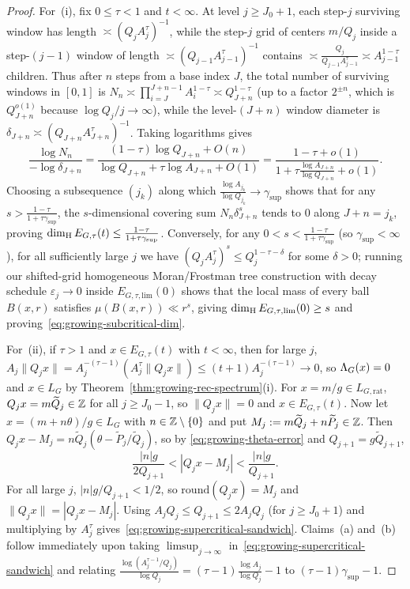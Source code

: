 \begin{proof}
For~(i), fix $0\le\tau<1$ and $t<\infty$. At level $j\ge J_0+1$, each step-$j$
surviving window has length $\asymp(Q_j A_j^\tau)^{-1}$, while the step-$j$ grid
of centers $m/Q_j$ inside a step-$(j-1)$ window of length $\asymp(Q_{j-1}A_{j-1}^\tau)^{-1}$
contains $\asymp\frac{Q_j}{Q_{j-1}A_{j-1}^\tau}\asymp A_{j-1}^{1-\tau}$ children.
Thus after $n$ steps from a base index $J$, the total number of surviving windows
in $[0,1]$ is $N_n\asymp\prod_{i=J}^{J+n-1}A_i^{1-\tau}\asymp Q_{J+n}^{1-\tau}$
(up to a factor $2^{\pm n}$, which is $Q_{J+n}^{o(1)}$ because $\log Q_j/j\to\infty$),
while the level-$(J+n)$ window diameter is $\delta_{J+n}\asymp(Q_{J+n}A_{J+n}^\tau)^{-1}$.
Taking logarithms gives
\[
\frac{\log N_n}{-\log\delta_{J+n}}
=\frac{(1-\tau)\log Q_{J+n}+O(n)}{\log Q_{J+n}+\tau\log A_{J+n}+O(1)}
=\frac{1-\tau+o(1)}{1+\tau\frac{\log A_{J+n}}{\log Q_{J+n}}+o(1)}.
\]
Choosing a subsequence $(j_k)$ along which $\frac{\log A_{j_k}}{\log Q_{j_k}}\to\gamma_{\sup}$
shows that for any $s>\frac{1-\tau}{1+\tau\gamma_{\sup}}$, the $s$-dimensional
covering sum $N_n\delta_{J+n}^s$ tends to $0$ along $J+n=j_k$, proving
$\dim_{\mathrm{H}} E_{G,\tau}(t)\le\frac{1-\tau}{1+\tau\gamma_{\sup}}$. Conversely, for any
$0<s<\frac{1-\tau}{1+\tau\gamma_{\sup}}$ (so $\gamma_{\sup}<\infty$), for all
sufficiently large $j$ we have $(Q_j A_j^\tau)^s\le Q_j^{1-\tau-\delta}$ for some
$\delta>0$; running our shifted-grid homogeneous Moran/Frostman tree construction
with decay schedule $\varepsilon_j\to0$ inside $E_{G,\tau,\mathrm{lim}}(0)$ shows
that the local mass of every ball $B(x,r)$ satisfies $\mu(B(x,r))\ll r^s$, giving
$\dim_{\mathrm{H}} E_{G,\tau,\mathrm{lim}}(0)\ge s$ and proving~\eqref{eq:growing-subcritical-dim}.

For~(ii), if $\tau>1$ and $x\in E_{G,\tau}(t)$ with $t<\infty$, then for large $j$,
$A_j\|Q_j x\|=A_j^{-(\tau-1)}(A_j^\tau\|Q_j x\|)\le(t+1)A_j^{-(\tau-1)}\to0$, so
$\Lambda_G(x)=0$ and $x\in L_G$ by Theorem~\ref{thm:growing-rec-spectrum}(i). For
$x=m/g\in L_{G,\mathrm{rat}}$, $Q_j x=m\widetilde Q_j\in\mathbb{Z}$ for all $j\ge J_0-1$,
so $\|Q_j x\|=0$ and $x\in E_{G,\tau}(t)$. Now let $x=(m+n\theta)/g\in L_G$ with
$n\in\mathbb{Z}\setminus\{0\}$ and put $M_j:=m\widetilde Q_j+n\widetilde P_j\in\mathbb{Z}$. Then
$Q_j x-M_j=n\widetilde Q_j(\theta-\widetilde P_j/\widetilde Q_j)$, so by
\eqref{eq:growing-theta-error} and $Q_{j+1}=g\widetilde Q_{j+1}$,
\[
\frac{|n|g}{2 Q_{j+1}}
<|Q_j x-M_j|
<\frac{|n|g}{Q_{j+1}}.
\]
For all large $j$, $|n|g/Q_{j+1}<1/2$, so $\mathrm{round}(Q_j x)=M_j$ and
$\|Q_j x\|=|Q_j x-M_j|$. Using $A_j Q_j\le Q_{j+1}\le 2 A_j Q_j$ (for $j\ge J_0+1$)
and multiplying by $A_j^\tau$ gives~\eqref{eq:growing-supercritical-sandwich}.
Claims~(a) and~(b) follow immediately upon taking $\limsup_{j\to\infty}$ in~\eqref{eq:growing-supercritical-sandwich}
and relating $\frac{\log(A_j^{\tau-1}/Q_j)}{\log Q_j}=(\tau-1)\frac{\log A_j}{\log Q_j}-1$
to $(\tau-1)\gamma_{\sup}-1$.
\end{proof}

